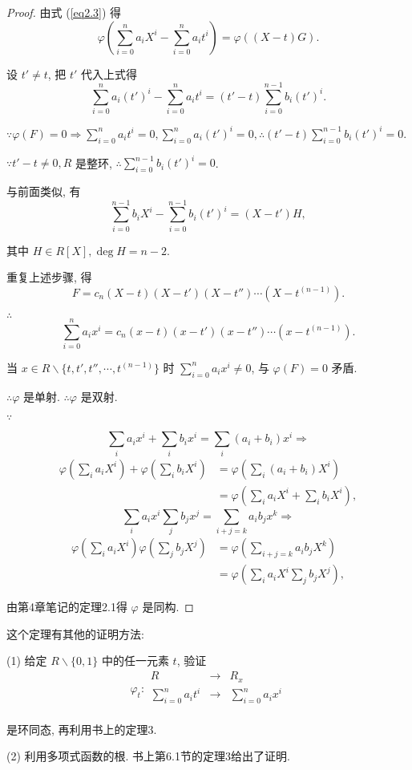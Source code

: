 \documentclass[UTF8]{ctexart}
\begin{document}
\begin{proof}
    由式 (\ref{eq2.3}) 得
    \[\varphi\left(\sum\limits_{i=0}^{n}a_iX^i-\sum\limits_{i=0}^{n}a_it^i\right)=\varphi\left((X-t)G\right).\]

    设 $t'\neq t$, 把 $t'$ 代入上式得
    \[\sum\limits_{i=0}^{n}a_i(t')^i-\sum\limits_{i=0}^{n}a_it^i=(t'-t)\sum\limits_{i=0}^{n-1}b_i(t')^i.\]

    $\because\varphi(F)=0\Rightarrow\sum\limits_{i=0}^{n}a_it^i=0,\sum\limits_{i=0}^{n}a_i(t')^i=0,\therefore(t'-t)\sum\limits_{i=0}^{n-1}b_i(t')^i=0$.

    $\because t'-t\neq0,R$ 是整环, $\therefore\sum\limits_{i=0}^{n-1}b_i(t')^i=0$.

    与前面类似, 有
    \[\sum\limits_{i=0}^{n-1}b_iX^i-\sum\limits_{i=0}^{n-1}b_i(t')^i=(X-t')H,\]

    其中 $H\in R[X],\deg H=n-2$.

    重复上述步骤, 得
    \[F=c_n(X-t)(X-t')(X-t'')\cdots(X-t^{(n-1)}).\]

    $\therefore$
    \[\sum\limits_{i=0}^{n}a_ix^i=c_n(x-t)(x-t')(x-t'')\cdots(x-t^{(n-1)}).\]

    当 $x\in R\backslash\{t,t',t'',\cdots,t^{(n-1)}\}$ 时 $\sum\limits_{i=0}^{n}a_ix^i\neq0$, 与 $\varphi(F)=0$ 矛盾.

    $\therefore\varphi$ 是单射. $\therefore\varphi$ 是双射.

    $\because$

    \[\sum\limits_ia_ix^i+\sum\limits_ib_ix^i=\sum\limits_i(a_i+b_i)x^i\Rightarrow\]
    \begin{align*}
        \varphi\left(\sum\limits_ia_iX^i\right)+\varphi\left(\sum\limits_ib_iX^i\right) & =\varphi\left(\sum\limits_i(a_i+b_i)X^i\right) \\
        & =\varphi\left(\sum\limits_ia_iX^i+\sum\limits_ib_iX^i\right),
    \end{align*}
    \[\sum\limits_ia_ix^i\sum\limits_jb_jx^j=\sum\limits_{i+j=k}a_ib_jx^k\Rightarrow\]
    \begin{align*}
        \varphi\left(\sum\limits_ia_iX^i\right)\varphi\left(\sum\limits_jb_jX^j\right) & =\varphi\left(\sum\limits_{i+j=k}a_ib_jX^k\right) \\
        & =\varphi\left(\sum\limits_ia_iX^i\sum\limits_jb_jX^j\right),
    \end{align*}

    由第4章笔记的定理2.1得 $\varphi$ 是同构.
\end{proof}
\begin{note}
    这个定理有其他的证明方法:

    (1) 给定 $R\backslash\{0,1\}$ 中的任一元素 $t$, 验证
    \[\varphi_t:\begin{array}{rcl}
        R & \to & R_x \\
        \sum\limits_{i=0}^{n}a_it^i & \to & \sum\limits_{i=0}^{n}a_ix^i \\
    \end{array}\]

    是环同态, 再利用书上的定理3.

    (2) 利用多项式函数的根. 书上第6.1节的定理3给出了证明.
\end{note}
\end{document}
